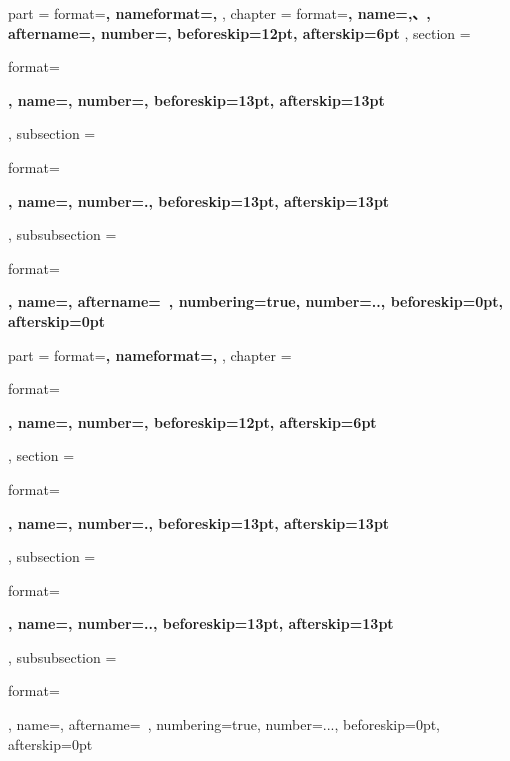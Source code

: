 {
    \ctexset
    {
        part =
            {
                format=\centering{}\bfseries,
                nameformat=\centering\heiti\fontsize{48}{48}\bfseries,
            },
        chapter =
         {
          format=\centering{}\bfseries,
          name={,、},
          aftername=,
          number=,
          beforeskip=12pt,
          afterskip=6pt
         },
        section =
         {
          format=\raggedright{}\bfseries,
          name={},
          number=,
          beforeskip=13pt,
          afterskip=13pt
         },
        subsection =
            {
                format=\raggedright{}\bfseries,
                name={},
                number=.,
                beforeskip=13pt,
                afterskip=13pt
            },
        subsubsection =
            {
                format=\raggedright{}\bfseries,
                name={},
                aftername=~,
                numbering=true,
                number=..,
                beforeskip=0pt,
                afterskip=0pt
            }
    }
}
{
    \ctexset
    {
        part =
            {
                format=\centering{}\bfseries,
                nameformat=\centering\heiti\fontsize{48}{48}\bfseries,
            },
        chapter =
         {
          format=\raggedright{}\bfseries,
          name={},
          number=,
          beforeskip=12pt,
          afterskip=6pt
         },
        section =
         {
          format=\raggedright{}\bfseries,
          name={},
          number=.,
          beforeskip=13pt,
          afterskip=13pt
         },
        subsection =
            {
                format=\raggedright{}\bfseries,
                name={},
                number=..,
                beforeskip=13pt,
                afterskip=13pt
            },
        subsubsection =
            {
                format=\raggedright{},
                name={},
                aftername=~,
                numbering=true,
                number=...,
                beforeskip=0pt,
                afterskip=0pt
            }
    }
}

\makeatletter
{}
\makeatother

